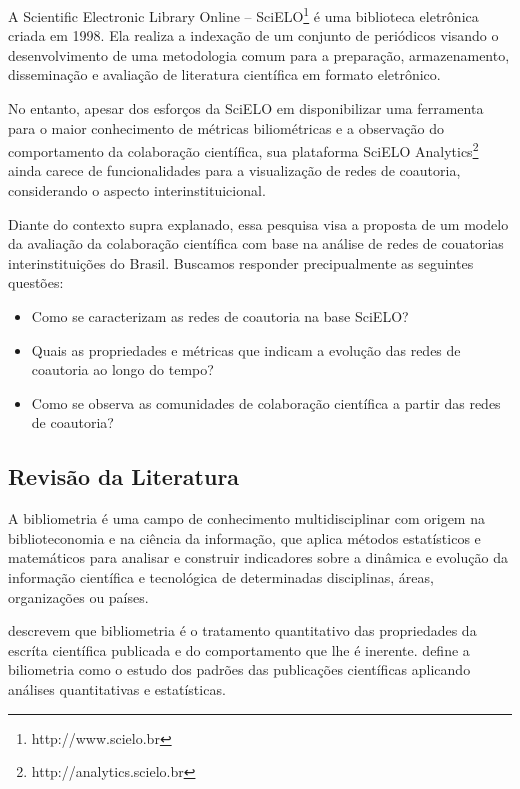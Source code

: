 \documentclass[12pt]{article}
\begin{document}
A Scientific Electronic Library Online -- SciELO\footnote{http://www.scielo.br} é uma biblioteca eletrônica criada em 1998.
Ela realiza a indexação de um conjunto de periódicos visando o desenvolvimento de uma metodologia comum para a preparação, armazenamento, disseminação e avaliação de literatura científica em formato eletrônico.

No entanto, apesar dos esforços da SciELO em disponibilizar uma ferramenta para o maior conhecimento de métricas biliométricas e a observação do comportamento da colaboração científica, sua plataforma SciELO Analytics\footnote{http://analytics.scielo.br} ainda carece de funcionalidades para a visualização de redes de coautoria, considerando o aspecto interinstituicional.

Diante do contexto supra explanado, essa pesquisa visa a proposta de um modelo da avaliação da colaboração científica com base na análise de redes de couatorias interinstituições do Brasil. 
Buscamos responder precipualmente as seguintes questões:
\begin{itemize}
\item Como se caracterizam as redes de coautoria na base SciELO?
\item Quais as propriedades e métricas que indicam a evolução das redes de coautoria ao longo do tempo?
\item Como se observa as comunidades de colaboração científica a partir das redes de coautoria?
\end{itemize}

\subsection{\textbf{Revisão da Literatura}}

A bibliometria é uma campo de conhecimento multidisciplinar com origem na biblioteconomia e na ciência da informação, que aplica métodos estatísticos e matemáticos para analisar e construir indicadores sobre a dinâmica e evolução da informação científica e tecnológica de determinadas disciplinas, áreas, organizações ou países.

\cite{pritchard1969statistical} descrevem que bibliometria é o tratamento quantitativo das propriedades da escríta científica publicada e do comportamento que lhe é inerente. 
\cite{osareh1996bibliometrics} define a biliometria como o estudo dos padrões das publicações científicas aplicando análises quantitativas e estatísticas. %
\end{document}
